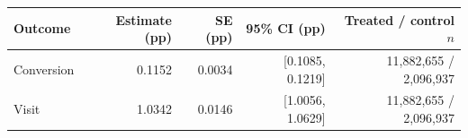 \begin{tabular}{@{}lrrrr@{}}
\toprule
Outcome & Estimate (pp) & SE (pp) & 95\% CI (pp) & Treated / control $n$ \\
\midrule
Conversion & 0.1152 & 0.0034 & [0.1085, 0.1219] & 11,882,655 / 2,096,937 \\
Visit & 1.0342 & 0.0146 & [1.0056, 1.0629] & 11,882,655 / 2,096,937 \\
\bottomrule
\end{tabular}
